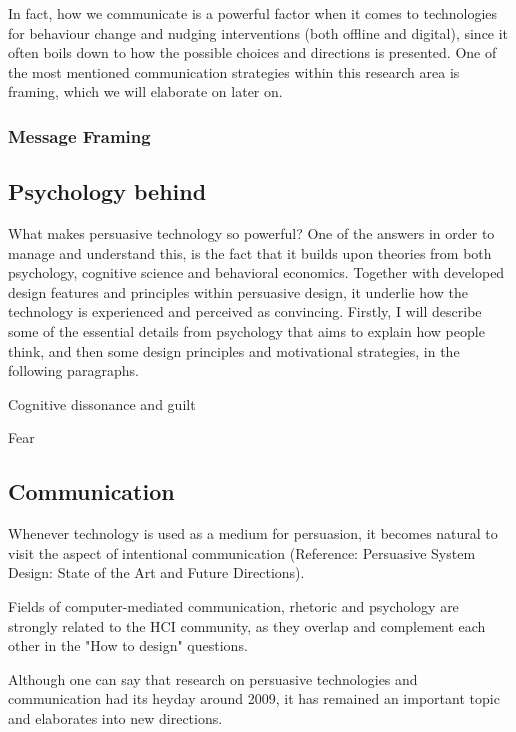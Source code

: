 In fact, how we communicate is a powerful factor when it comes to technologies for behaviour change and nudging interventions (both offline and digital), since it often boils down to how the possible choices and directions is presented. One of the most mentioned communication strategies within this research area is framing, which we will elaborate on later on. 

\subsubsection{Message Framing}



\subsection{Psychology behind}
What makes persuasive technology so powerful? One of the answers in order to manage and understand this, is the fact that it builds upon theories from both psychology, cognitive science and behavioral economics. Together with developed design features and principles within persuasive design, it underlie how the technology is experienced and perceived as convincing. Firstly, I will describe some of the essential details from psychology that aims to explain how people think, and then some design principles and motivational strategies, in the following paragraphs. 

Cognitive dissonance and guilt

Fear

\subsection{Communication}
Whenever technology is used as a medium for persuasion, it becomes natural to visit the aspect of intentional communication (Reference: Persuasive System Design: State of the Art and Future Directions). 

Fields of computer-mediated communication, rhetoric and psychology are strongly related to the HCI community, as they overlap and complement each other in the "How to design" questions. 


Although one can say that research on persuasive technologies and communication had its heyday around 2009, it has remained an important topic and elaborates into new directions. 


